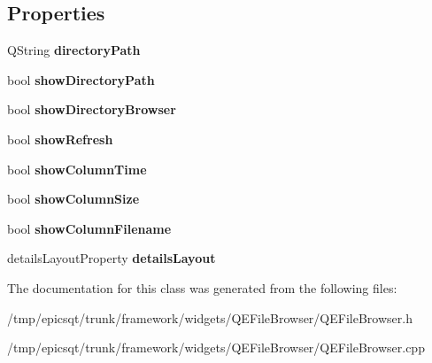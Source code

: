 \subsection*{Properties}
\begin{DoxyCompactItemize}
\item 
\hypertarget{classQEFileBrowser_a836ebfbaa4e155860e9a82baa338147d}{
QString {\bfseries directoryPath}}
\label{classQEFileBrowser_a836ebfbaa4e155860e9a82baa338147d}

\item 
\hypertarget{classQEFileBrowser_a695ff24a344dce4a0d4cf55030bb441f}{
bool {\bfseries showDirectoryPath}}
\label{classQEFileBrowser_a695ff24a344dce4a0d4cf55030bb441f}

\item 
\hypertarget{classQEFileBrowser_a593ffa87ffb6082835c17a5f3d9f00f8}{
bool {\bfseries showDirectoryBrowser}}
\label{classQEFileBrowser_a593ffa87ffb6082835c17a5f3d9f00f8}

\item 
\hypertarget{classQEFileBrowser_a54f8e9c79b23beda726ecd435d0e555a}{
bool {\bfseries showRefresh}}
\label{classQEFileBrowser_a54f8e9c79b23beda726ecd435d0e555a}

\item 
\hypertarget{classQEFileBrowser_aaa78a0b4e32da78a356f4eca255991d1}{
bool {\bfseries showColumnTime}}
\label{classQEFileBrowser_aaa78a0b4e32da78a356f4eca255991d1}

\item 
\hypertarget{classQEFileBrowser_a0b8e271d498e17dca3a45defe074464b}{
bool {\bfseries showColumnSize}}
\label{classQEFileBrowser_a0b8e271d498e17dca3a45defe074464b}

\item 
\hypertarget{classQEFileBrowser_af8fc10b03917ca11d4db81132dabcab3}{
bool {\bfseries showColumnFilename}}
\label{classQEFileBrowser_af8fc10b03917ca11d4db81132dabcab3}

\item 
\hypertarget{classQEFileBrowser_a48df305519267ad9493968f4eefeb27a}{
detailsLayoutProperty {\bfseries detailsLayout}}
\label{classQEFileBrowser_a48df305519267ad9493968f4eefeb27a}

\end{DoxyCompactItemize}


The documentation for this class was generated from the following files:\begin{DoxyCompactItemize}
\item 
/tmp/epicsqt/trunk/framework/widgets/QEFileBrowser/QEFileBrowser.h\item 
/tmp/epicsqt/trunk/framework/widgets/QEFileBrowser/QEFileBrowser.cpp\end{DoxyCompactItemize}
